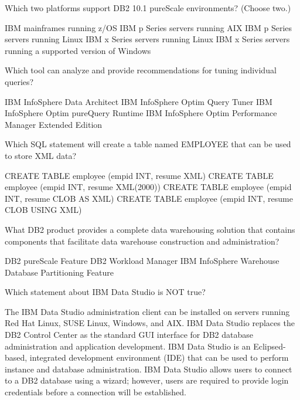 \documentclass[answers, 11pt]{exam}
\begin{document}
\begin{questions}
\question[1]
Which two platforms support DB2 10.1 pureScale environments? (Choose two.)
\begin{choices}
\choice IBM mainframes running z/OS
\choice IBM p Series servers running AIX
\choice IBM p Series servers running Linux
\choice IBM x Series servers running Linux
\choice IBM x Series servers running a supported version of Windows
\end{choices}

\newpage
\addpoints
\question[1]
Which tool can analyze and provide recommendations for tuning individual queries?
\begin{choices}
\choice IBM InfoSphere Data Architect
\choice IBM InfoSphere Optim Query Tuner
\choice IBM InfoSphere Optim pureQuery Runtime
\choice IBM InfoSphere Optim Performance Manager Extended Edition
\end{choices}

\question[1]
Which SQL statement will create a table named EMPLOYEE that can be used to store XML data?
\begin{choices}
\choice CREATE TABLE employee (empid INT, resume XML)
\choice CREATE TABLE employee (empid INT, resume XML(2000))
\choice CREATE TABLE employee (empid INT, resume CLOB AS XML)
\choice CREATE TABLE employee (empid INT, resume CLOB USING XML)
\end{choices}

\question[1]
What DB2 product provides a complete data warehousing solution that contains components
that facilitate data warehouse construction and administration?
\begin{choices}
\choice DB2 pureScale Feature
\choice DB2 Workload Manager
\choice IBM InfoSphere Warehouse
\choice Database Partitioning Feature
\end{choices}

\question[1]
Which statement about IBM Data Studio is NOT true?
\begin{choices}
\choice The IBM Data Studio administration client can be installed on servers running Red Hat Linux, SUSE Linux,
		Windows, and AIX.
\choice IBM Data Studio replaces the DB2 Control Center as the standard GUI interface for DB2 database administration
		and application development.
\choice IBM Data Studio is an Eclipsed-based, integrated development environment (IDE) that can be used to perform
		instance and database administration.
\choice IBM Data Studio allows users to connect to a DB2 database using a wizard; however, users are required to provide
		login credentials before a connection will be established.
\end{choices}


\end{questions}
\end{document}
